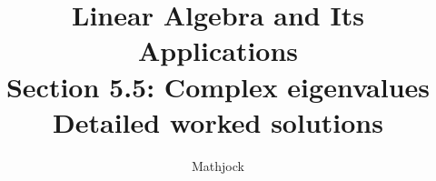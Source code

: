
\title{\textbf{Linear Algebra and Its Applications}\\[0.3em]Section 5.5: Complex eigenvalues\\[0.3em]\large Detailed worked solutions}
\author{Mathjock}
\date{}

\maketitle
\bookinfo
\tableofcontents
\clearpage
\renewcommand{\thesection}{5.\arabic{section}}
\renewcommand{\theHsection}{5.\arabic{section}}
\setcounter{section}{4}


